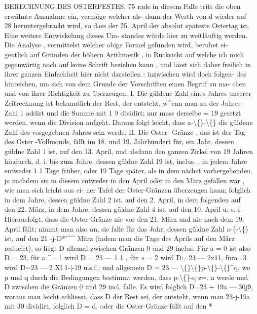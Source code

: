 \documentclass[12pt,a4paper]{article}
\begin{document}
\newpage

BERECHNUNG  DES  OSTERFESTES.  75
rade  in  diesem  Falle  tritt  die  oben  erwähnte  Ausnahme  ein,  vermöge  welcher  als-
dann der  Werth  von  d  wieder  auf  28  heruntergebracht  wird,  so  dass  der  25.
April  der  absolut  späteste  Ostertag  ist.  Eine  weitere  Entwickelung  dieses  Um-
standes  würde  hier  zu  weitläuftig  werden.
Die  Analyse ,  vermittelst  welcher  obige  Formel  gefunden  wird,  beruhet  ei-
gentlich auf  Gründen  der  höhern  Arithmetik ,  in  Rücksicht  auf  welche  ich  mich
gegenwärtig  noch  auf  keine  Schrift  beziehen  kann ,  und  lässt  sich  daher  freilich
in  ihrer  ganzen  Einfachheit  hier  nicht  darstellen :  inzwischen  wird  doch  folgen-
des hinreichen,  um  sich  von  dem  Grunde  der  Vorschriften  einen  Begriif  zu  ma-
chen und  von  ihrer  Richtigkeit  zu  überzeugen.
I.  Die  güldene  Zahl  eines  Jahres  unserer  Zeitrechnung  ist  bekanntlich  der
Rest,  der  entsteht,  w\^{}enn  man  zu  der  Jahres-Zahl  1  addirt  und  die  Summe  mit  1 9
dividirt;  nur  muss  derselbe  =  19  gesetzt  werden,  wenn  die  Division  aufgeht.
Daraus  folgt  leicht,  dass  a-\textbackslash\{\}-\textbackslash\{\}  die  güldene  Zahl  des  vorgegebnen  Jahres  sein  werde.
II.  Die  Oster- Gränze ,  das  ist  der  Tag  des  Oster -Vollmonds,  fällt  im  18.
und  19.  Jahrhundert  für, ein  Jahr,  dessen  güldne  Zahl  1  ist,  auf  den  13.  April,
und  alsdann  den  ganzen  Zirkel  von  19  Jahren  hindurch,  d.  i.  bis  zum  Jahre,
dessen  güldne  Zahl  19  ist,  inclus. ,  in  jedem  Jahre  entweder  1 1  Tage  früher,  oder
19  Tage  später,  als  in  dem  nächst  vorhergehenden,  je  nachdem  sie  in  diesem
entweder  in  den  April  oder  in  den  März  gefallen  war ,  wie  man  sich  leicht  aus  ei-
ner Tafel  der  Oster-Gränzen  überzeugen  kann;  folglich  in  dem  Jahre,  dessen
güldne  Zahl  2  ist,  auf  den  2.  April,  in  dem  folgenden  auf  den  22.  März,  in  dem
Jahre,  dessen  güldne  Zahl  4  ist,  auf  den  10.  April  u.  s.  f.  Hierausfolgt,  dass
die  Oster-Gränze  nie  vor  den  21.  März  und  nie  nach  dem  19.  April  fällt;  nimmt
man  also  an,  sie  falle  für  das  Jahr,  dessen  güldne  Zahl  a-\{-\textbackslash\{\}  ist,  auf  den
21  -j-D*'\^{}\^{}  März  (indem  man  die  Tage  des  Aprils  auf  den  März  reducirt),  so  liegt
D  allemal  zwischen  Gränzen  0  und  29  inclus.  Für  a  =  0  ist  also  D  =  23,
für  a  \^{}=  1  wird  D  =  23  ---  1 1 ,  für  «  =  2  wird  D;=23  ---  2x11,  füra=3
wird  D=23  ---  2  Xl  1-|-19  u.s.f.;  und  allgemein  D  =  23 --- \textbackslash\{\}\textbackslash\{\}p-\textbackslash\{\}-\textbackslash\{\}\^{}q,  wo  p
und  q  durch  die  Bedingungen  bestimmt  werden,  dass  p-\textbackslash\{\}-q  z=.  a  werde  und  D
zwischen  die  Gränzen  0  und  29  incl.  falle.  Es  wird  folglich  D=23  +  19a  ---  30j9,
woraus  man  leicht  schliesst,  dass  D  der  Rest  sei,  der  entsteht,  wenn  man
23-j-19a  mit  30  dividirt,  folglich  D  =  d,  oder  die  Oster-Gränze  fällt  auf  den
*
\end{document}
